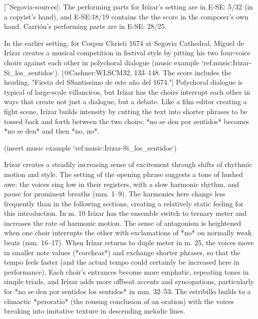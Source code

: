 [^Segovia-sources]: 
The performing parts for Irízar's setting are in E-SE: 5/32 (in a copyist's
hand), and E-SE:18/19 contains the the score in the composer's own hand.
Carrión's performing parts are in E-SE: 28/25.

In the earlier setting, for Corpus Christi 1674 at Segovia Cathedral,
Miguel de Irízar creates a musical competition in festival style by
pitting his two four-voice choirs against each other in polychoral dialogue
(music example `ref:music:Irizar-Si_los_sentidos`).
[@Cashner:WLSCM32, 133--148. 
The score includes the heading, "Fiesta del SSantissimo de este año del 1674."]
Polychoral dialogue is typical of large-scale villancicos, but Irízar has the
choirs interrupt each other in ways that create not just a dialogue, but a
debate. 
Like a film editor creating a fight scene, Irízar builds intensity by cutting
the text into shorter phrases to be tossed back and forth between the two
choirs: *no se den por sentidos* becomes *no se den* and then *no, no*. 

(insert music example `ref:music:Irizar-Si_los_sentidos`)
\label{music:Irizar-Si_los_sentidos}

Irízar creates a steadily increasing sense of excitement through shifts of
rhythmic motion and style. 
The setting of the opening phrase suggests a tone of hushed awe: the voices sing
low in their registers, with a slow harmonic rhythm, and pause for prominent
breaths (mm. 1--9). 
The harmonies here change less frequently than in the following sections,
creating a relatively static feeling for this introduction. 
In m. 10 Irízar has the ensemble switch to ternary meter and increases the rate
of harmonic motion. 
The sense of antagonism is heightened when one choir interrupts the other with
exclamations of *no* on normally weak beats (mm. 16--17). 
When Irízar returns to duple meter in m. 25, the voices move in smaller note
values (*corcheas*) and exchange shorter phrases, so that the tempo feels faster
(and the actual tempo could certainly be increased here in performance). 
Each choir's entrances become more emphatic, repeating tones in simple triads,
and Irízar adds more offbeat accents and syncopations, particularly for *no se
den por sentidos los sentidos* in mm. 32--53.
The estribillo builds to a climactic *peroratio* (the rousing conclusion of an
oration) with the voices breaking into imitative texture in descending melodic
lines. 

